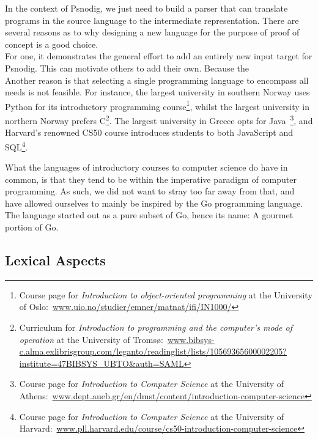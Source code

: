 In the context of Psnodig, we just need to build a parser that can translate programs in the source language to the intermediate representation. There are several reasons as to why designing a new language for the purpose of proof of concept is a good choice. \hfill \\

For one, it demonstrates the general effort to add an entirely new input target for Psnodig. This can motivate others to add their own. Because the  \hfill \\

Another reason is that selecting a single programming language to encompass all needs is not feasible. For instance, the largest university in southern Norway uses Python for its introductory programming course\footnote{Course page for \textit{Introduction to object-oriented programming} at the University of Oslo:~\url{www.uio.no/studier/emner/matnat/ifi/IN1000/}}, whilst the largest university in northern Norway prefers C\footnote{Curriculum for \textit{Introduction to programming and the computer's mode of operation} at the University of Tromsø:~\url{www.bibsys-c.alma.exlibrisgroup.com/leganto/readinglist/lists/10569365600002205?institute=47BIBSYS_UBTO&auth=SAML}}. The largest university in Greece opts for Java~\footnote{Course page for \textit{Introduction to Computer Science} at the University of Athens:~\url{www.dept.aueb.gr/en/dmst/content/introduction-computer-science}}, and Harvard's renowned CS50 course introduces students to both JavaScript and SQL\footnote{Course page for \textit{Introduction to Computer Science} at the University of Harvard:~\url{www.pll.harvard.edu/course/cs50-introduction-computer-science}}. \hfill \\


What the languages of introductory courses to computer science do have in common, is that they tend to be within the imperative paradigm of computer programming. As such, we did not want to stray too far away from that, and have allowed ourselves to mainly be inspired by the Go programming language. The language started out as a pure subset of Go, hence its name: A gourmet portion of Go.

\subsection{Lexical Aspects}

